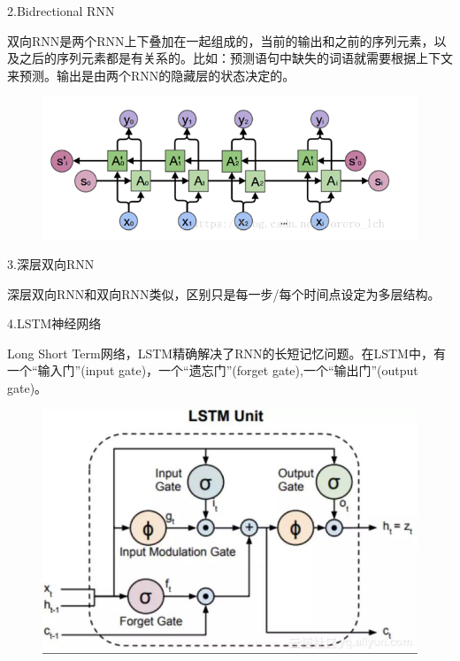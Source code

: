 \documentclass[openbib]{article}
\begin{document}
\begin{center}
	2.Bidrectional RNN
\end{center}

双向RNN是两个RNN上下叠加在一起组成的，当前的输出和之前的序列元素，以及之后的序列元素都是有关系的。比如：预测语句中缺失的词语就需要根据上下文来预测。输出是由两个RNN的隐藏层的状态决定的。
\begin{figure}[htbp]
	\centering
	\includegraphics[scale=0.44]{Bidirectional RNN模型}
\end{figure}
\begin{center}
	3.深层双向RNN
\end{center}

深层双向RNN和双向RNN类似，区别只是每一步/每个时间点设定为多层结构。

\begin{center}
	4.LSTM神经网络
\end{center}

Long Short Term网络，LSTM精确解决了RNN的长短记忆问题。在LSTM中，有一个“输入门”(input gate)，一个“遗忘门”(forget gate),一个“输出门”(output gate)。
\begin{figure}[htbp]
	\centering
	\includegraphics[scale=0.3]{LSTM神经网络结构图}
\end{figure}
\end{document}
